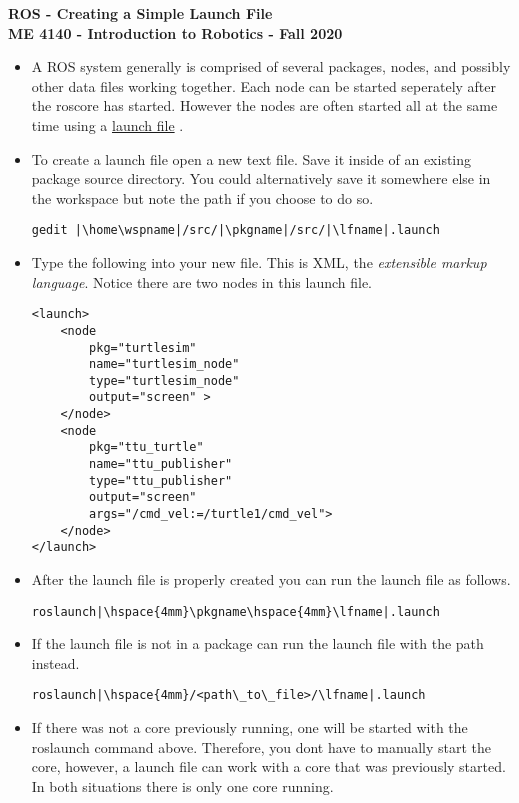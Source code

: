 \documentclass[12pt]{article}
\newcommand{\pkgname}{<package\_name>}
\newcommand{\wspname}{<workspace\_name>}
\newcommand{\lfname}{<launchfile\_name>}
\newcommand{\home}{\textasciitilde/}
\begin{document}
\thispagestyle{plain}

\begin{center}
   {\bf \Large ROS - Creating a Simple Launch File}\vspace{2mm} \\
   {\bf \large ME 4140 - Introduction to Robotics - Fall 2020} \\
\end{center}


\begin{itemize}
	
	\item A ROS system generally is comprised of several packages, nodes, and possibly other data files working together. Each node can be started seperately after the roscore has started. However the nodes are often started all at the same time using a  \href{http://wiki.ros.org/roslaunch} {launch file} .

	\item To create a launch file open a new text file. Save it inside of an existing package source directory. You could alternatively save it somewhere else in the workspace but note the path if you choose to do so.\\
	
\begin{verbatim}
gedit |\home\wspname|/src/|\pkgname|/src/|\lfname|.launch
\end{verbatim}
	 
	\item Type the following into your new file. This is XML, the {\it extensible markup language}. Notice there are two nodes in this launch file.
\begin{lstlisting}
<launch>
	<node 
		pkg="turtlesim" 
		name="turtlesim_node" 
		type="turtlesim_node"
		output="screen" >	
	</node>
	<node 
		pkg="ttu_turtle"
		name="ttu_publisher"  
		type="ttu_publisher"
		output="screen" 
		args="/cmd_vel:=/turtle1/cmd_vel">	
	</node>		
</launch>
\end{lstlisting}

	\item After the launch file is properly created you can run the launch file as follows.\\
\begin{verbatim}
roslaunch|\hspace{4mm}\pkgname\hspace{4mm}\lfname|.launch 
\end{verbatim}
	\item If the launch file is not in a package can run the launch file with the path instead.\\
\begin{verbatim}
roslaunch|\hspace{4mm}/<path\_to\_file>/\lfname|.launch 
\end{verbatim}

	\item If there was not a core previously running, one will be started with the roslaunch command above. Therefore, you dont have to manually start the core, however, a launch file can work with a core that was previously started. In both situations there is only one core running. 

	\end{itemize}
\end{document}
